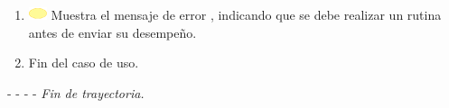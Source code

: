 \begin{enumerate}
	\item \includegraphics[width=15pt]{./Figuras/iconosCU/herramienta.png} Muestra el mensaje de error , indicando que se debe realizar un rutina antes de enviar su desempeño.
	\item Fin del caso de uso.
\end{enumerate}

- - - - \textit{Fin de trayectoria.} \\

\clearpage